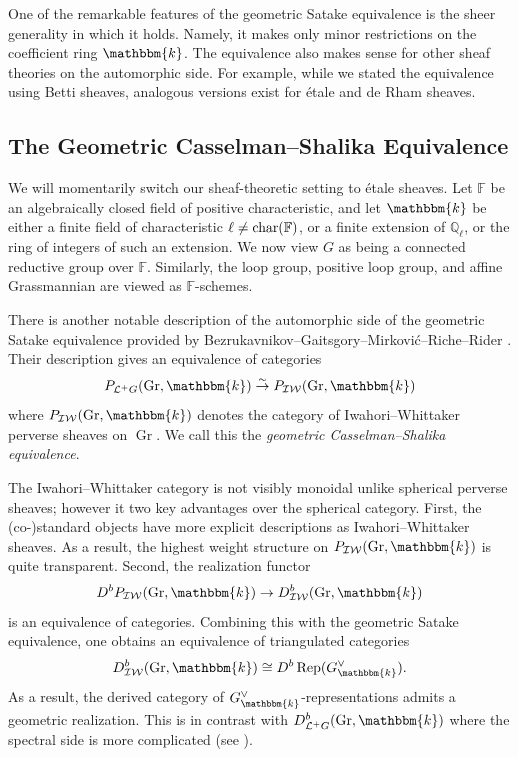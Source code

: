 \documentclass{amsart}
\newcommand{\Q}{\mathbb{Q}}
\newcommand{\F}{\mathbb{F}}
\renewcommand{\L}{\mathcal{L}}
\renewcommand{\k}{\mathbbm{k}}
\renewcommand{\char}{\textnormal{char}}
\newcommand{\IW}{\mathcal{IW}}
\DeclareMathOperator{\Rep}{Rep}
\DeclareMathOperator{\Gr}{Gr}
\theoremstyle{definition}
\begin{document}
    One of the remarkable features of the geometric Satake equivalence is the sheer generality in which it holds. Namely, it makes only minor restrictions on the coefficient ring $\k$.
    The equivalence also makes sense for other sheaf theories on the automorphic side. For example, while we stated the equivalence using Betti sheaves, analogous versions exist for étale and de Rham sheaves. 

    \subsection{The Geometric Casselman--Shalika Equivalence}

    We will momentarily switch our sheaf-theoretic setting to étale sheaves.
    Let $\F$ be an algebraically closed field of positive characteristic, and let $\k$ be either a finite field of characteristic $\ell \neq \char (\F)$, or a finite extension of $\Q_{\ell}$, or the ring of integers of such an extension.
    We now view $G$ as being a connected reductive group over $\F$. Similarly, the loop group, positive loop group, and affine Grassmannian are viewed as $\F$-schemes.

    There is another notable description of the automorphic side of the geometric Satake equivalence provided by Bezrukavnikov--Gaitsgory--Mirković--Riche--Rider \cite{BGMRR}.
    Their description gives an equivalence of categories
    \[P_{\L^+ G} (\Gr, \k) \stackrel{\sim}{\to} P_{\IW} (\Gr, \k)\]
    where $P_{\IW} (\Gr, \k)$ denotes the category of Iwahori--Whittaker perverse sheaves on $\Gr$. 
    We call this the \emph{geometric Casselman--Shalika equivalence}.

    The Iwahori--Whittaker category is  not visibly monoidal unlike spherical perverse sheaves; however it two key advantages over the spherical category. First, the (co-)standard objects have more explicit descriptions as Iwahori--Whittaker sheaves.
    As a result, the highest weight structure on $P_{\IW} (\Gr, \k)$ is quite transparent.
    Second, the realization functor
    \[D^b P_{\IW} (\Gr, \k) \to D_{\IW}^b (\Gr, \k)\]
    is an equivalence of categories. Combining this with the geometric Satake equivalence, one obtains an equivalence of triangulated categories
    \[D_{\IW}^b (\Gr, \k) \cong D^b \Rep (G_{\k}^{\vee}). \] 
    As a result, the derived category of $G_{\k}^{\vee}$-representations admits a geometric realization. This is in contrast with $D_{\L^+ G}^b (\Gr, \k)$ where the spectral side is more complicated (see \cite{BF}).
\end{document}
